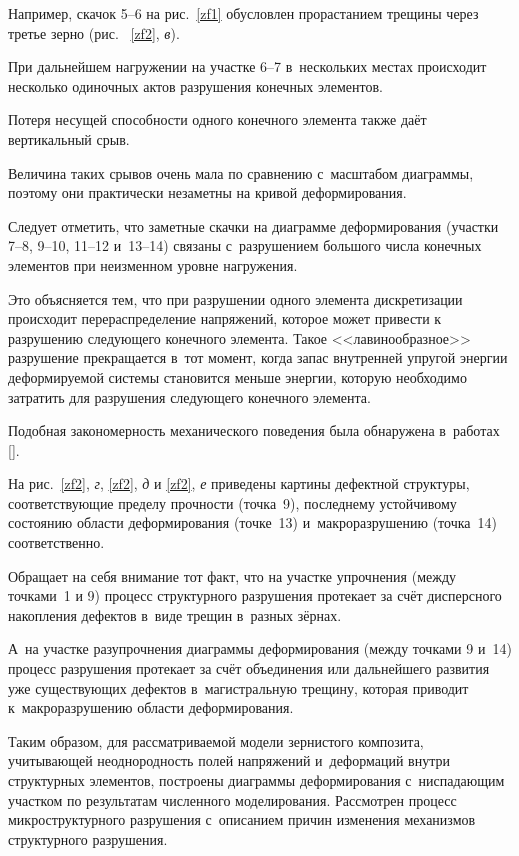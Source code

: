 Например, скачок 5--6 на рис.~\ref{zf1} обусловлен прорастанием трещины через третье зерно (рис. ~\ref{zf2}, {\sl в}). 

При дальнейшем нагружении на участке 6--7 в~нескольких местах происходит несколько одиночных актов разрушения конечных элементов. 

Потеря несущей способности одного конечного элемента также даёт вертикальный срыв. 

Величина таких срывов очень мала по сравнению с~масштабом диаграммы, поэтому они практически незаметны на кривой деформирования.



Следует отметить, что заметные скачки на диаграмме деформирования (участки 7--8, 9--10, 11--12 и~13--14) связаны с~разрушением большого числа конечных элементов при неизменном уровне нагружения. 

Это объясняется тем, что при разрушении одного элемента дискретизации происходит перераспределение напряжений, которое может привести к разрушению следующего конечного элемента. Такое <<лавинообразное>> разрушение прекращается в~тот момент, когда запас внутренней упругой энергии деформируемой системы становится меньше энергии, которую необходимо затратить для разрушения следующего конечного элемента. 

Подобная закономерность механического поведения была обнаружена в~работах [].



На рис.~\ref{zf2}, {\sl г}, \ref{zf2}, {\sl д} и \ref{zf2}, {\sl е} приведены картины дефектной структуры, соответствующие пределу прочности (точка~9), последнему устойчивому состоянию области деформирования (точке~13) и~макроразрушению (точка~14) соответственно. 

Обращает на себя внимание тот факт, что на участке упрочнения (между точками~1 и 9) процесс структурного разрушения протекает за счёт дисперсного накопления дефектов в~виде трещин в~разных зёрнах. 

А~на участке разупрочнения диаграммы деформирования (между точками 9 и~14) процесс разрушения протекает за счёт объединения или дальнейшего развития уже существующих дефектов в~магистральную трещину, которая приводит к~макроразрушению области деформирования.



Таким образом, для рассматриваемой модели зернистого композита, учитывающей неоднородность полей напряжений и~деформаций внутри структурных элементов, построены диаграммы деформирования с~ниспадающим участком по результатам численного моделирования. Рассмотрен процесс микроструктурного разрушения с~описанием причин изменения механизмов структурного разрушения. 

